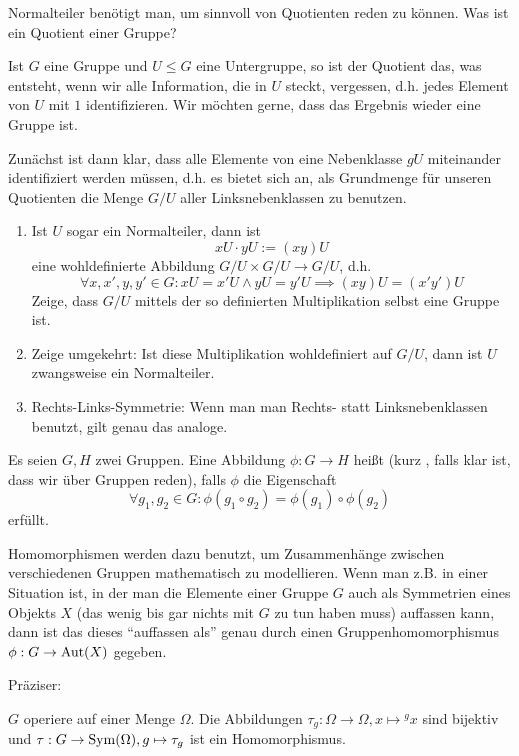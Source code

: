 \begin{sheet}
\begin{problem}[title={Quotientengruppen}, difficulty={fortgeschritten}]
Normalteiler benötigt man, um sinnvoll von Quotienten reden zu können. Was ist ein Quotient einer Gruppe?

Ist $G$ eine Gruppe und $U\leq G$ eine Untergruppe, so ist der Quotient das, was entsteht, wenn wir alle Information, die in $U$ steckt, vergessen, d.h. jedes Element von $U$ mit $1$ identifizieren. Wir möchten gerne, dass das Ergebnis wieder eine Gruppe ist.

Zunächst ist dann klar, dass alle Elemente von eine Nebenklasse $gU$ miteinander identifiziert werden müssen, d.h. es bietet sich an, als Grundmenge für unseren Quotienten die Menge $G/U$ aller Linksnebenklassen zu benutzen.
\begin{enumerate}
\item Ist $U$ sogar ein Normalteiler, dann ist
\[xU \cdot yU := (xy)U\]
eine wohldefinierte Abbildung $G/U \times G/U \to G/U$, d.h.
\[\forall x,x',y,y'\in G: xU=x'U \wedge yU=y'U \implies (xy)U = (x'y')U\]
Zeige, dass $G/U$ mittels der so definierten Multiplikation selbst eine Gruppe ist.
\item Zeige umgekehrt: Ist diese Multiplikation wohldefiniert auf $G/U$, dann ist $U$ zwangsweise ein Normalteiler.
\item Rechts-Links-Symmetrie: Wenn man man Rechts- statt Linksnebenklassen benutzt, gilt genau das analoge.
\end{enumerate}
\end{problem}



\begin{problem}[title={Gruppenhomomorphismen}]
Es seien $G,H$ zwei Gruppen. Eine Abbildung $\phi: G\to H$ heißt  (kurz , falls klar ist, dass wir über Gruppen reden), falls $\phi$ die Eigenschaft
\[\forall g_1,g_2\in G: \phi(g_1\circ g_2) = \phi(g_1)\circ \phi(g_2)\]
erfüllt.

Homomorphismen werden dazu benutzt, um Zusammenhänge zwischen verschiedenen Gruppen mathematisch zu modellieren. Wenn man z.B. in einer Situation ist, in der man die Elemente einer Gruppe $G$ auch als Symmetrien eines Objekts $X$ (das wenig bis gar nichts mit $G$ zu tun haben muss) auffassen kann, dann ist das dieses \enquote{auffassen als} genau durch einen Gruppenhomomorphismus $\phi: G\to\operatorname{Aut}(X)$ gegeben.

Präziser:
\begin{subproblem}
$G$ operiere auf einer Menge $\Omega$. Die Abbildungen $\tau_g: \Omega\to\Omega, x\mapsto{^g x}$ sind bijektiv und $\tau: G\to\operatorname{Sym}(\Omega), g\mapsto\tau_g$ ist ein Homomorphismus.


\end{subproblem}
\end{problem}
\end{sheet}
